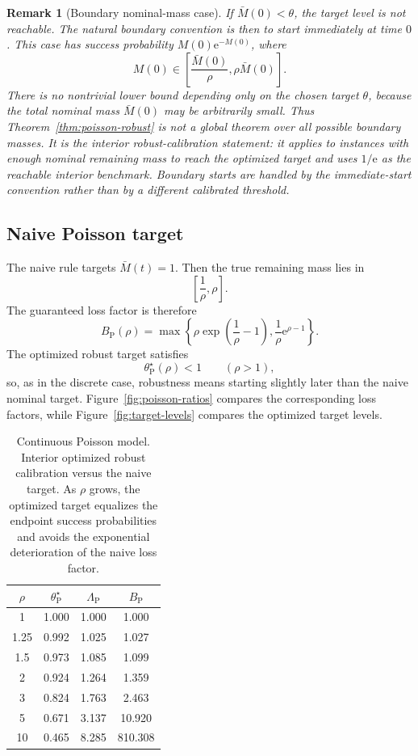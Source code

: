 \documentclass[11pt,a4paper]{article}
\newtheorem{remark}{Remark}
\newcommand{\e}{\mathrm e}
\begin{document}
\begin{remark}[Boundary nominal-mass case]
If \(\bar M(0)<\theta\), the target level is not reachable.  The natural
boundary convention is then to start immediately at time \(0\).  This case has
success probability \(M(0)\e^{-M(0)}\), where
\[
  M(0)\in\left[\frac{\bar M(0)}{\rho},\rho\bar M(0)\right].
\]
There is no nontrivial lower bound depending only on the chosen target
\(\theta\), because the total nominal mass \(\bar M(0)\) may be arbitrarily
small.  Thus Theorem~\ref{thm:poisson-robust} is not a global theorem over all
possible boundary masses.  It is the interior robust-calibration statement: it
applies to instances with enough nominal remaining mass to reach the optimized
target and uses \(1/\e\) as the reachable interior benchmark.  Boundary starts
are handled by the immediate-start convention rather than by a different
calibrated threshold.
\end{remark}

\subsection{Naive Poisson target}

The naive rule targets \(\bar M(t)=1\).  Then the true remaining mass lies in
\[
  \left[\frac1\rho,\rho\right].
\]
The guaranteed loss factor is therefore
\[
  \boxed{
  B_{\mathrm P}(\rho)
  =
  \max\left\{
    \rho\exp\left(\frac1\rho-1\right),
    \frac1\rho\e^{\rho-1}
  \right\}.
  }
  \tag{11}
\]
The optimized robust target satisfies
\[
  \theta^\star_{\mathrm P}(\rho)<1
  \qquad(\rho>1),
\]
so, as in the discrete case, robustness means starting slightly later than the
naive nominal target.  Figure~\ref{fig:poisson-ratios} compares the
corresponding loss factors, while Figure~\ref{fig:target-levels} compares the
optimized target levels.

\begin{table}[ht]
\centering
\caption{Continuous Poisson model.  Interior optimized robust calibration versus
the naive target.  As \(\rho\) grows, the optimized target equalizes the endpoint
success probabilities and avoids the exponential deterioration of the naive loss
factor.}
\begin{tabular}{c c c c}
\toprule
\(\rho\)
& \(\theta^\star_{\mathrm P}\)
& \(\Lambda_{\mathrm P}\)
& \(B_{\mathrm P}\)\\
\midrule
1 & 1.000 & 1.000 & 1.000 \\
1.25 & 0.992 & 1.025 & 1.027 \\
1.5 & 0.973 & 1.085 & 1.099 \\
2 & 0.924 & 1.264 & 1.359 \\
3 & 0.824 & 1.763 & 2.463 \\
5 & 0.671 & 3.137 & 10.920 \\
10 & 0.465 & 8.285 & 810.308 \\
\bottomrule
\end{tabular}
\end{table}
\end{document}
